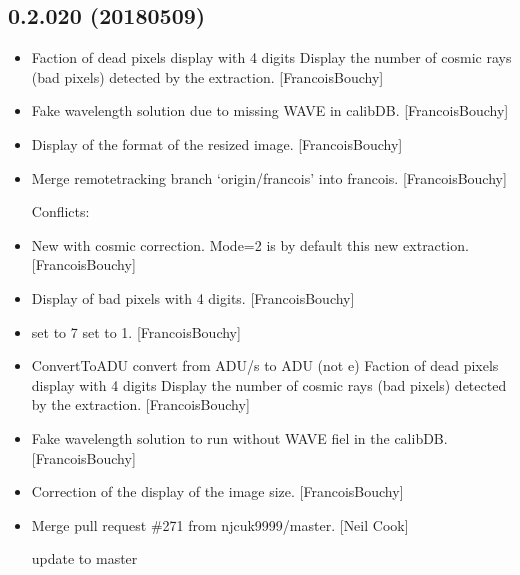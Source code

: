 \documentclass[a4paper,10pt,english]{report}
\begin{document}
\subsection{0.2.020 (2018\sphinxhyphen{}05\sphinxhyphen{}09)}
\label{\detokenize{misc/changelog:id461}}\begin{itemize}
\item {} 
Faction of dead pixels display with 4 digits Display the number of
cosmic rays (bad pixels) detected by the extraction. {[}FrancoisBouchy{]}

\item {} 
Fake wavelength solution due to missing WAVE in calibDB.
{[}FrancoisBouchy{]}

\item {} 
Display of the format of the resized image. {[}FrancoisBouchy{]}

\item {} 
Merge remote\sphinxhyphen{}tracking branch ‘origin/francois’ into francois.
{[}FrancoisBouchy{]}
\begin{description}
\item[{Conflicts:}] \leavevmode
{}

\end{description}

\item {} 
New  with cosmic correction. Mode=2 is by
default this new extraction. {[}FrancoisBouchy{]}

\item {} 
Display of bad pixels with 4 digits. {[}FrancoisBouchy{]}

\item {} 
 set to 7  set to \sphinxhyphen{}1. {[}FrancoisBouchy{]}

\item {} 
ConvertToADU convert from ADU/s to ADU (not e\sphinxhyphen{}) Faction of dead pixels
display with 4 digits Display the number of cosmic rays (bad pixels)
detected by the extraction. {[}FrancoisBouchy{]}

\item {} 
Fake wavelength solution to run without WAVE fiel in the calibDB.
{[}FrancoisBouchy{]}

\item {} 
Correction of the display of the image size. {[}FrancoisBouchy{]}

\item {} 
Merge pull request \#271 from njcuk9999/master. {[}Neil Cook{]}

update to master

\end{itemize}
\end{document}
